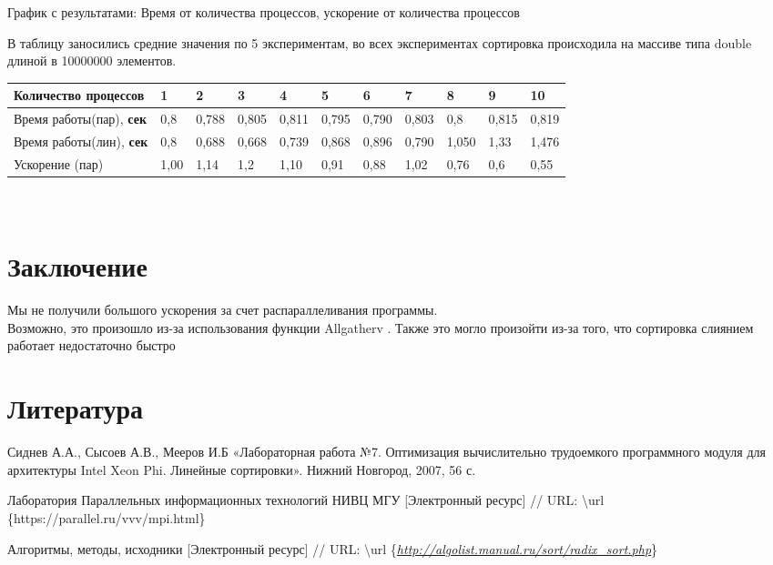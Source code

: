 \documentclass[]{article}
\begin{document}
График с результатами: Время от количества процессов, ускорение от
количества процессов

В таблицу заносились средние значения по 5 экспериментам, во всех
экспериментах сортировка происходила на массиве типа double длиной в
10000000 элементов.

\begin{longtable}[]{@{}lllllllllll@{}}
\toprule
Количество процессов & 1 & 2 & 3 & 4 & 5 & 6 & 7 & 8 & 9 &
10\tabularnewline
\midrule
\endhead
Время работы(пар), \textbf{сек} & 0,8 & 0,788 & 0,805 & 0,811 & 0,795 &
0,790 & 0,803 & 0,8 & 0,815 & 0,819\tabularnewline
Время работы(лин), \textbf{сек} & 0,8 & 0,688 & 0,668 & 0,739 & 0,868 &
0,896 & 0,790 & 1,050 & 1,33 & 1,476\tabularnewline
Ускорение (пар) & 1,00 & 1,14 & 1,2 & 1,10 & 0,91 & 0,88 & 1,02 & 0,76 &
0,6 & 0,55\tabularnewline
\bottomrule
\end{longtable}

\section{\texorpdfstring{\\
Заключение}{ Заключение}}\label{ux437ux430ux43aux43bux44eux447ux435ux43dux438ux435}

Мы не получили большого ускорения за счет распараллеливания программы.\\
Возможно, это произошло из-за использования функции Allgatherv . Также
это могло произойти из-за того, что сортировка слиянием работает
недостаточно быстро

\section{}\label{section}

\section{Литература}\label{ux43bux438ux442ux435ux440ux430ux442ux443ux440ux430}

Сиднев А.А., Сысоев А.В., Мееров И.Б «Лабораторная работа №7.
Оптимизация вычислительно трудоемкого программного модуля для
архитектуры Intel Xeon Phi. Линейные сортировки». Нижний Новгород, 2007,
56 с.

Лаборатория Параллельных информационных технологий НИВЦ МГУ
{[}Электронный ресурс{]} // URL: \textbackslash{}url
\{https://parallel.ru/vvv/mpi.html\}

Алгоритмы, методы, исходники {[}Электронный ресурс{]} // URL:
\textbackslash{}url
\{\href{http://algolist.manual.ru/sort/radix_sort.php}{\emph{http://algolist.manual.ru/sort/radix\_sort.php}}\}
\end{document}
